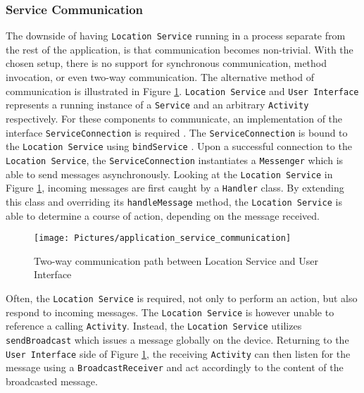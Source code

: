 \subsubsection{Service Communication}\label{subsubsec:service_communication}
The downside of having \texttt{Location Service} running in a process separate from the rest of the application, is that communication becomes non-trivial. With the chosen setup, there is no support for synchronous communication, method invocation, or even two-way communication. The alternative method of communication is illustrated in Figure \ref{fig:application_service_communication}. \texttt{Location Service} and \texttt{User Interface} represents a running instance of a \texttt{Service} and an arbitrary \texttt{Activity} respectively. For these components to communicate, an implementation of the interface \texttt{ServiceConnection} is required \citep{android_serviceconnection}.  The \texttt{ServiceConnection} is bound to the \texttt{Location Service} using \texttt{bindService} \citep{android_bindservice}. Upon a successful connection to the \texttt{Location Service}, the \texttt{ServiceConnection} instantiates a \texttt{Messenger} \citep{android_messenger} which is able to send messages asynchronously. Looking at the \texttt{Location Service} in Figure \ref{fig:application_service_communication}, incoming messages are first caught by a \texttt{Handler} \citep{android_handler} class. By extending this class and overriding its \texttt{handleMessage} method, the \texttt{Location Service} is able to determine a course of action, depending on the message received.

\begin{figure}[tb]
\centering
\texttt{[image: Pictures/application\_service\_communication]}
\caption{Two-way communication path between Location Service and User Interface}
\label{fig:application_service_communication}
\end{figure}

Often, the \texttt{Location Service} is required, not only to perform an action, but also respond to incoming messages. The \texttt{Location Service} is however unable to reference a calling \texttt{Activity}. Instead, the \texttt{Location Service} utilizes \texttt{sendBroadcast} \citep{android_sendbroadcast} which issues a message globally on the device. Returning to the \texttt{User Interface} side of Figure \ref{fig:application_service_communication}, the receiving \texttt{Activity} can then listen for the message using a \texttt{BroadcastReceiver} \citep{android_broadcastreceiver} and act accordingly to the content of the broadcasted message. 

